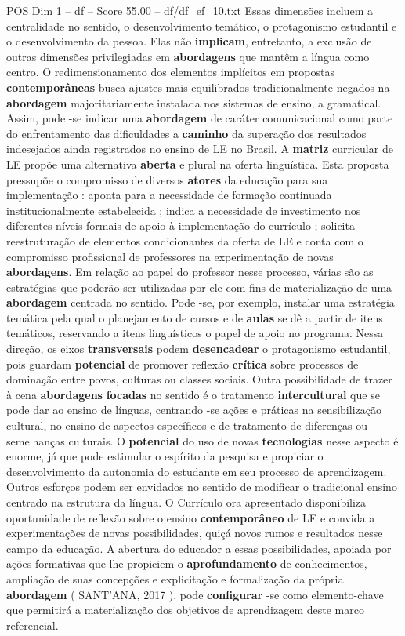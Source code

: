 \begin{textsample}{POS Dim 1 – df – Score 55.00 – df/df\_ef\_10.txt}
Essas dimensões incluem a centralidade no sentido, o desenvolvimento temático, o protagonismo estudantil e o desenvolvimento da pessoa.
Elas não \textbf{implicam}, entretanto, a exclusão de outras dimensões privilegiadas em \textbf{abordagens} que mantêm a língua como centro.
O redimensionamento dos elementos implícitos em propostas \textbf{contemporâneas} busca ajustes mais equilibrados tradicionalmente negados na \textbf{abordagem} majoritariamente instalada nos sistemas de ensino, a gramatical.
Assim, pode -se indicar uma \textbf{abordagem} de caráter comunicacional como parte do enfrentamento das dificuldades a \textbf{caminho} da superação dos resultados indesejados ainda registrados no ensino de LE no Brasil.
A \textbf{matriz} curricular de LE propõe uma alternativa \textbf{aberta} e plural na oferta linguística.
Esta proposta pressupõe o compromisso de diversos \textbf{atores} da educação para sua implementação : aponta para a necessidade de formação continuada institucionalmente estabelecida ; indica a necessidade de investimento nos diferentes níveis formais de apoio à implementação do currículo ; solicita reestruturação de elementos condicionantes da oferta de LE e conta com o compromisso profissional de professores na experimentação de novas \textbf{abordagens}.
Em relação ao papel do professor nesse processo, várias são as estratégias que poderão ser utilizadas por ele com fins de materialização de uma \textbf{abordagem} centrada no sentido.
Pode -se, por exemplo, instalar uma estratégia temática pela qual o planejamento de cursos e de \textbf{aulas} se dê a partir de itens temáticos, reservando a itens linguísticos o papel de apoio no programa.
Nessa direção, os eixos \textbf{transversais} podem \textbf{desencadear} o protagonismo estudantil, pois guardam \textbf{potencial} de promover reflexão \textbf{crítica} sobre processos de dominação entre povos, culturas ou classes sociais.
Outra possibilidade de trazer à cena \textbf{abordagens} \textbf{focadas} no sentido é o tratamento \textbf{intercultural} que se pode dar ao ensino de línguas, centrando -se ações e práticas na sensibilização cultural, no ensino de aspectos específicos e de tratamento de diferenças ou semelhanças culturais.
O \textbf{potencial} do uso de novas \textbf{tecnologias} nesse aspecto é enorme, já que pode estimular o espírito da pesquisa e propiciar o desenvolvimento da autonomia do estudante em seu processo de aprendizagem.
Outros esforços podem ser envidados no sentido de modificar o tradicional ensino centrado na estrutura da língua.
O Currículo ora apresentado disponibiliza oportunidade de reflexão sobre o ensino \textbf{contemporâneo} de LE e convida a experimentações de novas possibilidades, quiçá novos rumos e resultados nesse campo da educação.
A abertura do educador a essas possibilidades, apoiada por ações formativas que lhe propiciem o \textbf{aprofundamento} de conhecimentos, ampliação de suas concepções e explicitação e formalização da própria \textbf{abordagem} ( SANT’ANA, 2017 ), pode \textbf{configurar} -se como elemento-chave que permitirá a materialização dos objetivos de aprendizagem deste marco referencial.


\end{textsample}
